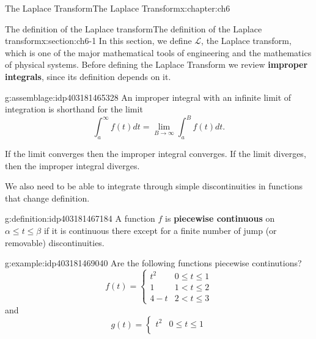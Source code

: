 \documentclass[oneside,10pt,]{book}
\newcommand{\terminology}[1]{\textbf{#1}}
\numberwithin{equation}{section}
\numberwithin{equation}{section}
\newcommand{\lt}{<}
\newcommand{\amp}{&}
\begin{document}
%
%
\typeout{************************************************}
\typeout{************************************************}
%
\begin{chapterptx}{The Laplace Transform}{}{The Laplace Transform}{}{}{x:chapter:ch6}
%
%
\typeout{************************************************}
\typeout{************************************************}
%
\begin{sectionptx}{The definition of the Laplace transform}{}{The definition of the Laplace transform}{}{}{x:section:ch6-1}
In this section, we define \(\mathcal{L}\), the Laplace transform, which is one of the major mathematical tools of engineering and the mathematics of physical systems. Before defining the Laplace Transform we review \terminology{improper integrals},         since its definition depends on it.%
\begin{assemblage}{}{g:assemblage:idp403181465328}%
An improper integral with an infinite limit of integration is shorthand for the limit%
\begin{equation*}
\int_{a}^{\infty}f(t)dt=\lim_{B\to\infty}\int_{a}^{B}f(t)dt.
\end{equation*}
%
\end{assemblage}
If the limit converges then the improper integral converges. If the limit diverges, then the improper integral diverges.%
\par
We also need to be able to integrate through simple discontinuities in functions that change definition.%
\begin{definition}{}{g:definition:idp403181467184}%
A function \(f\) is \terminology{piecewise continuous} on \(\alpha\leq t\leq\beta\) if it is continuous there except for a finite number of jump (or removable) discontinuities.%
\end{definition}
\begin{example}{}{g:example:idp403181469040}%
Are the following functions piecewise continutions?%
\begin{equation*}
f(t)=\begin{cases}
t^{2} \amp 0\leq t\leq1\\
1 \amp 1\lt t\leq2\\
4-t \amp 2\lt t\leq3
\end{cases}
\end{equation*}
and%
\begin{equation*}
g(t)=\begin{cases}
t^{2} \amp 0\leq t\leq1\\

\end{cases}
\end{equation*}
\end{example}
\end{sectionptx}
\end{chapterptx}
\end{document}
